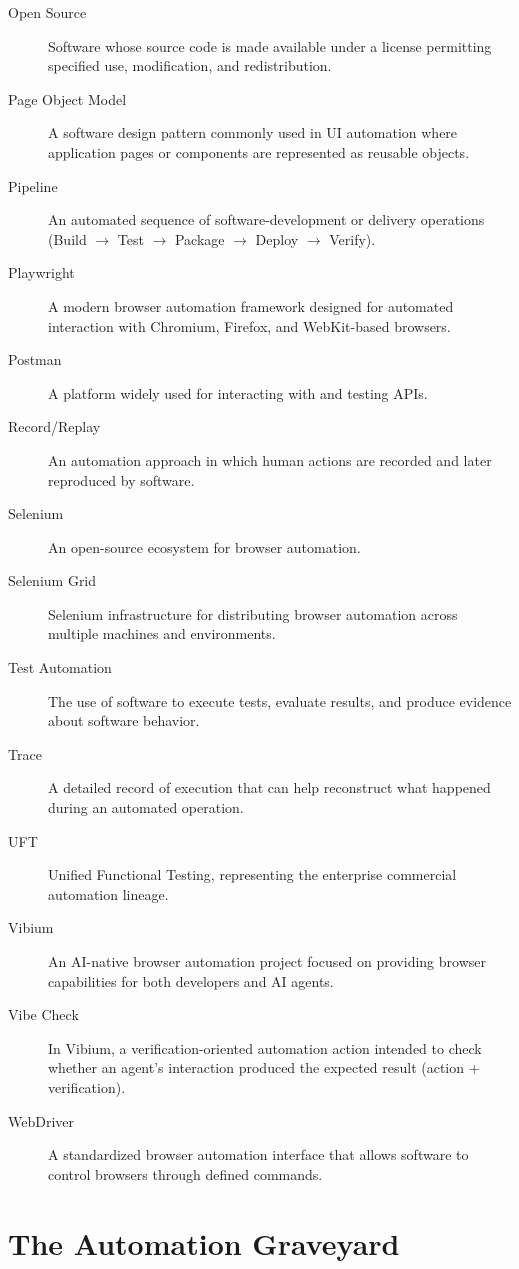 \documentclass[11pt,twoside]{book}
\begin{document}
\begin{description}
    \item[Open Source] Software whose source code is made available under a license permitting specified use, modification, and redistribution.
    \item[Page Object Model] A software design pattern commonly used in UI automation where application pages or components are represented as reusable objects.
    \item[Pipeline] An automated sequence of software-development or delivery operations (Build $\rightarrow$ Test $\rightarrow$ Package $\rightarrow$ Deploy $\rightarrow$ Verify).
    \item[Playwright] A modern browser automation framework designed for automated interaction with Chromium, Firefox, and WebKit-based browsers.
    \item[Postman] A platform widely used for interacting with and testing APIs.
    \item[Record/Replay] An automation approach in which human actions are recorded and later reproduced by software.
    \item[Selenium] An open-source ecosystem for browser automation.
    \item[Selenium Grid] Selenium infrastructure for distributing browser automation across multiple machines and environments.
    \item[Test Automation] The use of software to execute tests, evaluate results, and produce evidence about software behavior.
    \item[Trace] A detailed record of execution that can help reconstruct what happened during an automated operation.
    \item[UFT] Unified Functional Testing, representing the enterprise commercial automation lineage.
    \item[Vibium] An AI-native browser automation project focused on providing browser capabilities for both developers and AI agents.
    \item[Vibe Check] In Vibium, a verification-oriented automation action intended to check whether an agent's interaction produced the expected result (action + verification).
    \item[WebDriver] A standardized browser automation interface that allows software to control browsers through defined commands.
\end{description}


\chapter{The Automation Graveyard}
\label{app:graveyard}
\end{document}

